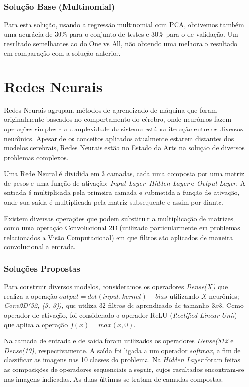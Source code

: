 \documentclass[conference]{IEEEtran}
\begin{document}
\subsubsection{Solução Base (Multinomial)}
Para esta solução, usando a regressão multinomial com PCA, obtivemos também uma acurácia de 30\% para o conjunto de testes e 30\% para o de validação. Um resultado semelhantes ao do One vs All, não obtendo uma melhora o resultado em comparação com a solução anterior.


\section{Redes Neurais}
Redes Neurais agrupam métodos de aprendizado de máquina que foram originalmente baseados no comportamento do cérebro, onde neurônios fazem operações simples e a complexidade do sistema está na iteração entre os diversos neurônios. Apesar de os conceitos aplicados atualmente estarem distantes dos modelos cerebrais, Redes Neurais estão no Estado da Arte na solução de diversos problemas complexos. 

Uma Rede Neural é dividida em 3 camadas, cada uma composta por uma matriz de pesos e uma função de ativação: \textit{Input Layer}, \textit{Hidden Layer} e \textit{Output Layer}. A entrada é multiplicada pela primeira camada e submetida a função de ativação, onde sua saída é multiplicada pela matriz subsequente e assim por diante. 

Existem diversas operações que podem substituir a multiplicação de matrizes, como uma operação Convolucional 2D (utilizado particularmente em problemas relacionados a Visão Computacional) em que filtros são aplicados de maneira convolucional a entrada. 

\subsubsection{Soluções Propostas}
Para construir diversos modelos, consideramos os operadores \textit{Dense($X$)} que realiza a operação $output = dot(input, kernel) + bias$ utilizando $X$ neurônios; \textit{Conv2D(32, (3, 3))}, que utiliza 32 filtros de aprendizado de tamanho $3x3$. Como operador de ativação, foi considerado o operador ReLU (\textit{Rectified Linear Unit}) que aplica a operação $f(x) = max(x, 0)$. 

Na camada de entrada e de saída foram utilizados os operadores \textit{Dense(512} e \textit{Dense(10)}, respectivamente. A saída foi ligada a um operador \textit{softmax}, a fim de classificar as imagens nas 10 classes do problema. Na \textit{Hidden Layer} foram feitas as composições de operadores sequenciais a seguir, cujos resultados encontram-se nas imagens indicadas. As duas últimas se tratam de camadas compostas.
\end{document}
